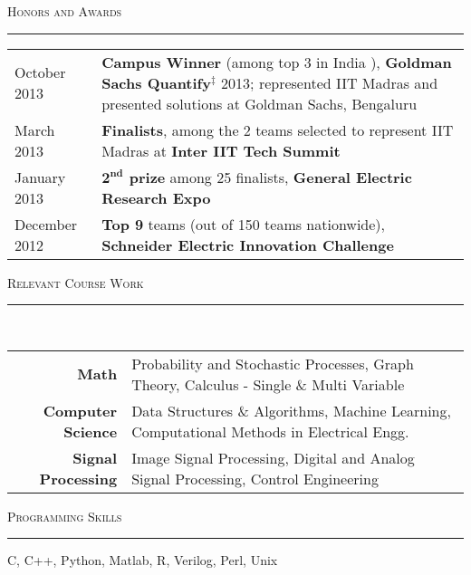 \documentclass[8pt,a4paper,English]{article}
\newcommand{\lv}{\color{table-border}\vrule}
\newcommand\roottitle[1]{ \vspace{3mm} \noindent \textsc{ \large #1} \vspace{1.5mm} \nopagebreak[4] \color{gray} \hrule \color{black} \vspace{2mm} \noindent \small }
\begin{document}

\roottitle{Honors and Awards}
\renewcommand{\arraystretch}{1.2}
\setlength\tabcolsep{8pt}
\begin{tabularx}{\textwidth}{ R{2.6cm} !{\lv} X }
    October 2013    & \textbf{Campus Winner} (among top {3} in India ), \textbf{Goldman Sachs Quantify}$^\ddag$ 2013; represented IIT Madras and presented solutions at Goldman Sachs, Bengaluru \\
	March 2013		& \textbf{Finalists}, among the 2 teams selected to represent IIT Madras at \textbf{Inter IIT Tech Summit} \\
    January 2013    & \textbf{$\mathbf{2^{nd}}$ prize} among 25 finalists, \textbf{General Electric Research Expo} \\ 
    December 2012   & \textbf{Top 9} teams (out of 150 teams nationwide), \textbf{Schneider Electric Innovation Challenge} \\ 
\end{tabularx}


\roottitle{Relevant Course Work} \\
\renewcommand{\arraystretch}{1.2}
\setlength\tabcolsep{8pt}
\begin{tabularx}{\textwidth}{ r !{\lv} X }
\textbf{Math}               & Probability and Stochastic Processes, Graph Theory, Calculus - Single \& Multi Variable \\
\textbf{Computer Science}   & Data Structures \& Algorithms, Machine Learning, Computational Methods in Electrical Engg. \\
\textbf{Signal Processing}  & Image Signal Processing, Digital and Analog Signal Processing, Control Engineering \\[2pt]
\end{tabularx}


\roottitle{Programming Skills}
\noindent C, C++, Python, Matlab, R, Verilog, Perl, Unix \\[-5pt]

\end{document}

